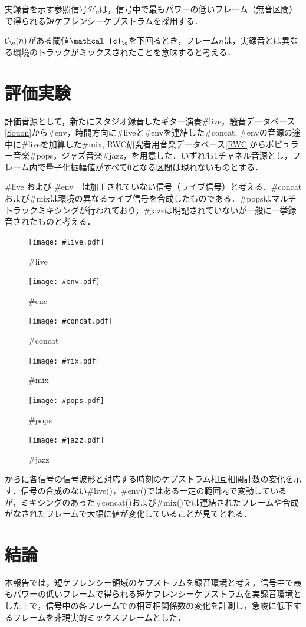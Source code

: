 \documentclass[technicalreport]{ieicej}
\begin{document}
実録音を示す参照信号$\mathcal{H}_0$は，信号中で最もパワーの低いフレーム（無音区間）で得られる短ケフレンシーケプストラムを採用する．

$\mathcal{C}_{\o}(n)$がある閾値$\mathcal{c}_{\o}$を下回るとき，フレーム$n$は，実録音とは異なる環境のトラックがミックスされたことを意味すると考える．

\section{評価実験}

評価音源として，新たにスタジオ録音したギター演奏\#live，騒音データベース\ref{Souon}から\#env，時間方向に\#liveと\#envを連結した\#concat, \#envの音源の途中に\#liveを加算した\#mix, RWC研究者用音楽データベース\ref{RWC}からポピュラー音楽\#pops，ジャズ音楽\#jazz，を用意した．いずれも1チャネル音源とし，フレーム内で量子化振幅値がすべて0となる区間は現れないものとする．

\#live および \#env　は加工されていない信号（ライブ信号）と考える．\#concatおよび\#mixは環境の異なるライブ信号を合成したものである．\#popsはマルチトラックミキシングが行われており，\#jazzは明記されていないが一般に一挙録音されたものと考える．

\begin{figure}
	\centering
	\texttt{[image: \#live.pdf]}
	\caption{#live}
	\label{fig:result_live}
\end{figure}
\begin{figure}
	\centering
	\texttt{[image: \#env.pdf]}
	\caption{#enc}
	\label{fig:result_env}
\end{figure}
\begin{figure}
	\centering
	\texttt{[image: \#concat.pdf]}
	\caption{#concat}
	\label{fig:result_concat}
\end{figure}
\begin{figure}
	\centering
	\texttt{[image: \#mix.pdf]}
	\caption{#mix}
	\label{fig:result_mix}
\end{figure}
\begin{figure}
	\centering
	\texttt{[image: \#pops.pdf]}
	\caption{#pops}
	\label{fig:result_pops}
\end{figure}
\begin{figure}
	\centering
	\texttt{[image: \#jazz.pdf]}
	\caption{#jazz}
	\label{fig:result_jazz}
\end{figure}

からに各信号の信号波形と対応する時刻のケプストラム相互相関計数の変化を示す．信号の合成のない\#live()，\#env()ではある一定の範囲内で変動しているが，ミキシングのあった\#concat()および\#mix()では連結されたフレームや合成がなされたフレームで大幅に値が変化していることが見てとれる．




\section{結論}
本報告では，短ケフレンシー領域のケプストラムを録音環境と考え，信号中で最もパワーの低いフレームで得られる短ケフレンシーケプストラムを実録音環境とした上で，信号中の各フレームでの相互相関係数の変化を計測し，急峻に低下するフレームを非現実的ミックスフレームとした．




\end{document}
